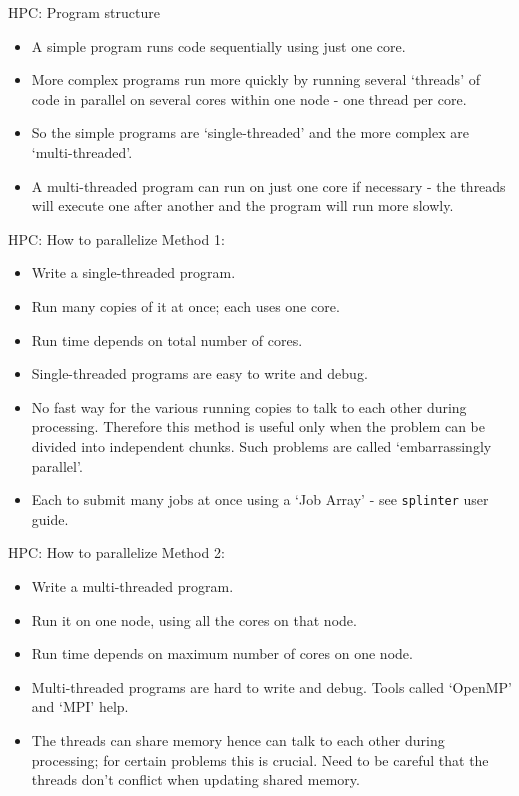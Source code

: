 \documentclass{beamer}
\begin{document}
\begin{frame}{HPC: Program structure}
  \begin{itemize}
    \item A simple program runs code sequentially using just one core.
    \item More complex programs run more quickly by running several `threads' of code in parallel on several cores within one node - one thread per core.
    \item So the simple programs are `single-threaded' and the more complex are `multi-threaded'.
    \item A multi-threaded program can run on just one core if necessary - the threads will execute one after another and the program will run more slowly.
  \end{itemize}
\end{frame}

\begin{frame}{HPC: How to parallelize}
  Method 1:
  \begin{itemize}
    \item Write a single-threaded program.
    \item Run many copies of it at once; each uses one core.
    \item Run time depends on total number of cores.
    \item Single-threaded programs are easy to write and debug.
    \item No fast way for the various running copies to talk to each other during processing. Therefore this method is useful only when the problem can be divided into independent chunks. Such problems are called `embarrassingly parallel'.
    \item Each to submit many jobs at once using a `Job Array' - see \texttt{splinter} user guide.
  \end{itemize}
\end{frame}

\begin{frame}{HPC: How to parallelize}
  Method 2:
  \begin{itemize}
    \item Write a multi-threaded program.
    \item Run it on one node, using all the cores on that node.
    \item Run time depends on maximum number of cores on one node.
    \item Multi-threaded programs are hard to write and debug. Tools called `OpenMP' and `MPI' help.
    \item The threads can share memory hence can talk to each other during processing; for certain problems this is crucial. Need to be careful that the threads don't conflict when updating shared memory.
  \end{itemize}
\end{frame}
\end{document}
